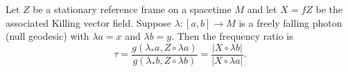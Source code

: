 Let $Z$ be a stationary reference frame on a spacetime $M$ and let $X = fZ$ be the associated Killing vector field. Suppose $\lambda: [a, b] \to M$ is a freely falling photon (null geodesic) with $\lambda a = x$ and $\lambda b = y$. Then the frequency ratio is
$$
\tau = \frac{g(\lambda_* a, Z \circ \lambda a)}{g(\lambda_* b, Z \circ \lambda b)} = \frac{|X \circ \lambda b|}{|X \circ \lambda a|}.
$$
